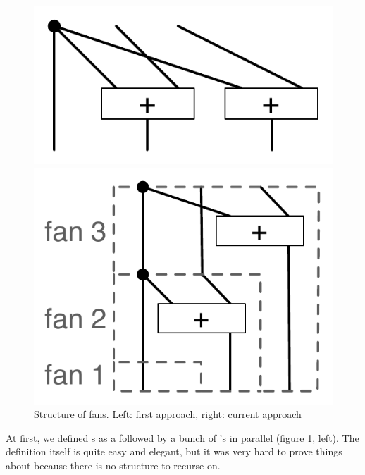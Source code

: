 \begin{figure}[ht]
\centering
\begin{minipage}{.5\textwidth}
  \centering
  \includegraphics[scale=0.4]{fan_structure_old.pdf}
\end{minipage}%
\begin{minipage}{.5\textwidth}
  \centering
  \includegraphics[scale=0.4]{fan_structure.pdf}
\end{minipage}
\caption{Structure of fans. Left: first approach, right: current approach}
\label{fig:fan-structure}
\end{figure}

At first, we defined s as a  followed by a bunch of
's in parallel (figure \ref{fig:fan-structure}, left).
The definition itself is quite easy and elegant, but it was very hard
to prove things about because there is no structure to recurse on.

